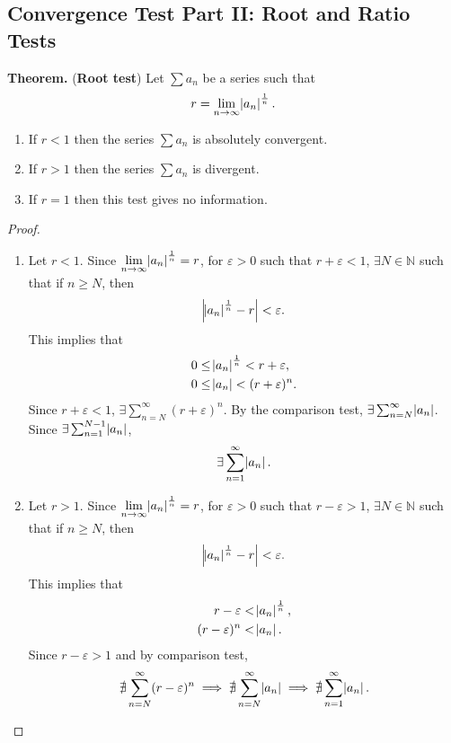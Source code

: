 \documentclass[12pt,a4paper]{article}
\begin{document}
\subsection{Convergence Test Part II: Root and Ratio Tests}
\begin{tcolorbox}[enhanced, breakable, colback=white]
	\textbf{Theorem.} (\textbf{Root test}) Let $\sum a_n$ be a series such that \[
	r=\lim\limits_{n\to\infty}\abs{a_n}^{\frac{1}{n}}.
	\]\begin{enumerate}
		\item If $r<1$ then the series $\sum a_n$ is absolutely convergent.
		\item If $r>1$ then the series $\sum a_n$ is divergent.
		\item If $r=1$ then this test gives no information.
	\end{enumerate}\tcblower\begin{proof}
		\ \begin{enumerate}
			\item Let $r<1$. Since $\lim\limits_{n\to\infty}\abs{a_n}^{\frac{1}{n}}=r$, for $\varepsilon>0$ such that $r+\varepsilon<1$, $\exists N\in\mathbb{N}$ such that if $n\geq N$, then \[
			\abs{\abs{a_n}^{\frac{1}{n}}-r}<\varepsilon.
			\] This implies that \begin{align*}
			0&\leq \abs{a_n}^{\frac{1}{n}}<r+\varepsilon, \\
			0&\leq\abs{a_n}<(r+\varepsilon)^n.
			\end{align*} Since $r+\varepsilon<1$, $\exists\sum_{n=N}^\infty(r+\varepsilon)^n$. By the comparison test, $\exists\sum_{n=N}^\infty\abs{a_n}$. Since $\exists\sum_{n=1}^{N-1}\abs{a_n}$, \[
			\exists\sum_{n=1}^\infty\abs{a_n}.
			\]
			\item Let $r>1$. Since $\lim\limits_{n\to\infty}\abs{a_n}^{\frac{1}{n}}=r$, for $\varepsilon>0$ such that $r-\varepsilon>1$, $\exists N\in\mathbb{N}$ such that if $n\geq N$, then \[
			\abs{\abs{a_n}^{\frac{1}{n}}-r}<\varepsilon.
			\] This implies that \begin{align*}
			r-\varepsilon&<\abs{a_n}^{\frac{1}{n}}, \\
			(r-\varepsilon)^n&<\abs{a_n}.
			\end{align*} Since $r-\varepsilon>1$ and by comparison test, \[
			\nexists\sum_{n=N}^\infty(r-\varepsilon)^n\implies\nexists\sum_{n=N}^\infty\abs{a_n}\implies \nexists\sum_{n=1}^\infty\abs{a_n}.
			\]
		\end{enumerate}
	\end{proof}
\end{tcolorbox}
\end{document}
